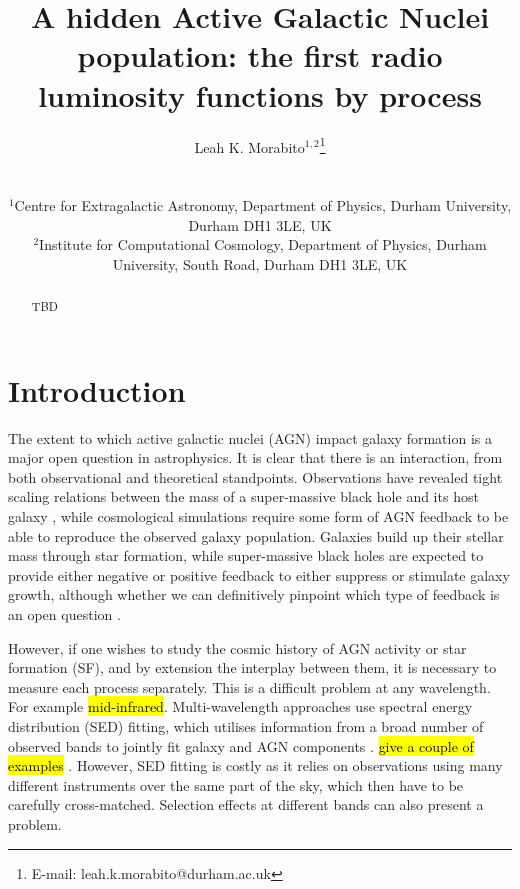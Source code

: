 \documentclass[usenatbib,fleqn,letters]{mnras}
\title[TBD]{A hidden Active Galactic Nuclei population: the first radio luminosity functions by process}
\author[L.K. Morabito]{\parbox{\textwidth}{Leah K. Morabito$^{1,2}$\thanks{E-mail: leah.k.morabito@durham.ac.uk}\orcidlink{0000-0003-0487-6651}\\}\\ 
$^{1}$Centre for Extragalactic Astronomy, Department of Physics, Durham University, Durham DH1 3LE, UK \\
$^{2}$Institute for Computational Cosmology, Department of Physics, Durham University, South Road, Durham DH1 3LE, UK \\ }
\begin{document}
\date{}
\pagerange{\pageref{firstpage}--\pageref{lastpage}} 
\maketitle

\label{firstpage}


\begin{abstract}
    TBD
    \vspace{6.75in}
\end{abstract}




\section{Introduction}
\label{sec:intro}
The extent to which active galactic nuclei (AGN) impact galaxy formation is a major open question in astrophysics. It is clear that there is an interaction, from both observational and theoretical standpoints. Observations have revealed tight scaling relations between the mass of a super-massive black hole and its host galaxy \citep[see, e.g.][and references therein]{kormendy_coevolution_2013}, while cosmological simulations require some form of AGN feedback \citep{bower_breaking_2006,croton_many_2006} to be able to reproduce the observed galaxy population. Galaxies build up their stellar mass through star formation, while super-massive black holes are expected to provide either negative or positive feedback to either suppress or stimulate galaxy growth, although whether we can definitively pinpoint which type of feedback is an open question \citep{ward_cosmological_2022}. 

However, if one wishes to study the cosmic history of AGN activity or star formation (SF), and by extension the interplay between them, it is necessary to measure each process separately. This is a difficult problem at any wavelength. For example \hl{mid-infrared}. Multi-wavelength approaches use spectral energy distribution (SED) fitting, which utilises information from a broad number of observed bands to jointly fit galaxy and AGN components \citep{pacifici_art_2022}. \hl{give a couple of examples} \citep{calistro_rivera_agnfitter_2016,boquien_cigale_2019}. However, SED fitting is costly as it relies on observations using many different instruments over the same part of the sky, which then have to be carefully cross-matched. Selection effects at different bands can also present a problem. 
\end{document}
